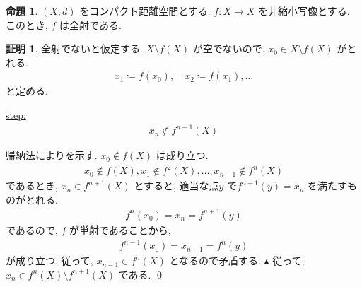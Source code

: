 \documentclass[10pt, fleqn, label-section=none]{bxjsarticle}
\theoremstyle{definition}
\newtheorem{prop}[dfn]{命題}
\newtheorem*{pf*}{証明}
\renewcommand{\;}{\, ; \,}
\newenvironment{claim}[1]{\par\noindent\underline{step:}\space#1}{}
\newenvironment{claimproof}[1]{\par\noindent{($\because$)}\space#1}{\hfill $\blacktriangle $}
\begin{document}
\begin{prop}$(X, d)$ をコンパクト距離空間とする. $f: X \rightarrow X$ を非縮小写像とする. このとき, $f$ は全射である. 

\end{prop}
\begin{pf*}全射でないと仮定する. $X \setminus f(X)$ が空でないので, $x_0 \in X \setminus f(X)$ がとれる. 
\begin{align*} x_1 \coloneqq f(x_0), \quad x_2 \coloneqq f(x_1), \ldots \end{align*}
と定める. 
\begin{claim}
\begin{align*}x_n \notin f^{n+1}(X) \end{align*}
\end{claim}
\begin{claimproof}
帰納法によりを示す. $x_0 \notin f(X)$ は成り立つ. 
\begin{align*} x_0 \notin f(X), x_1 \notin f^2(X), \ldots, x_{n -1} \notin f^{n}(X) \end{align*}
であるとき, $x_n \in f^{n+1} (X)$ とすると, 適当な点$y$ で$f^{n+1}(y) = x_n$ を満たすものがとれる. 
\begin{align*} f^n (x_0) = x_n = f^{n+1}(y) \end{align*}
であるので, $f$ が単射であることから, 
\begin{align*} f^{n-1} (x_0) = x_{n-1} = f^n (y) \end{align*}
が成り立つ. 従って, $x_{n-1} \in f^n (X)$ となるので矛盾する. 
\end{claimproof}
従って, $x_n \in f^n(X) \setminus f^{n+1}(X)$ である. 
\qed
\end{pf*}
\end{document}
